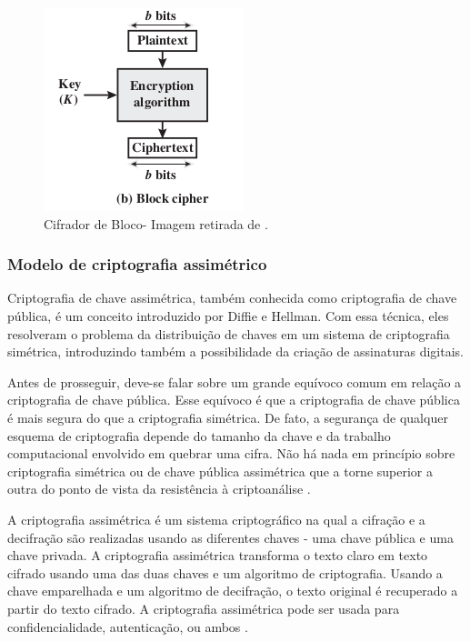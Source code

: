                 \begin{figure}[H]
                     \centering
                     \includegraphics[scale=0.7]{figuras/capitulo_2/block_cipher.png}
                     \caption{Cifrador de Bloco- Imagem retirada de \cite{cryptograpy_and_network_stallings}.}
                     \label{fig:imagem_block_cipher}
                \end{figure}
            
            
        \subsubsection{Modelo de criptografia assimétrico}
        
                Criptografia de chave assimétrica, também conhecida como criptografia de chave pública, é um conceito introduzido por Diffie e Hellman. Com essa técnica, eles resolveram o problema da distribuição de chaves em um sistema de criptografia simétrica, introduzindo também a possibilidade da criação de assinaturas digitais.\cite{beginnig_blockchain_bikramaditya}
                
                Antes de prosseguir, deve-se falar sobre um grande equívoco comum em relação a criptografia de chave pública. Esse equívoco é que a criptografia de chave pública é mais segura do que a criptografia simétrica. De fato, a segurança de qualquer esquema de criptografia depende do tamanho da chave e da trabalho computacional envolvido em quebrar uma cifra. Não há nada em princípio sobre criptografia simétrica ou de chave pública assimétrica que a torne superior a outra do ponto de vista da resistência à criptoanálise \cite{cryptograpy_and_network_stallings}.

                A criptografia assimétrica é um sistema criptográfico na qual a cifração
                e a decifração são realizadas usando as diferentes chaves - uma chave pública e uma chave privada. A criptografia assimétrica transforma o texto claro em texto cifrado usando uma das duas chaves e um algoritmo de criptografia. Usando a chave emparelhada e um algoritmo de decifração, o texto original é recuperado a partir do texto cifrado. A criptografia assimétrica pode ser usada para confidencialidade, autenticação, ou ambos   \cite{cryptograpy_and_network_stallings}.

